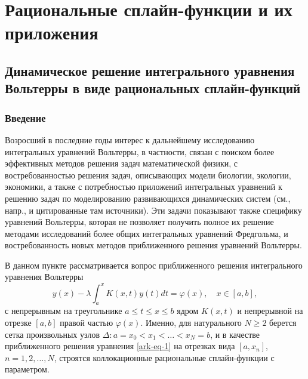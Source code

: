 \chapter{Рациональные сплайн-функции и их приложения}

\section{Динамическое решение интегрального уравнения Вольтерры в виде
рациональных сплайн-функций}
%

\subsection{Введение}

Возросший в последние годы интерес к дальнейшему исследованию интегральных уравнений
Вольтерры, в частности, связан с поиском более эффективных методов решения задач
математической физики, с востребованностью решения задач, описывающих модели
биологии, экологии, экономики, а также с потребностью приложений интегральных уравнений
к решению задач по моделированию развивающихся динамических систем (см., напр., \cite{ark-3}
и цитированные там источники). Эти задачи показывают также специфику
уравнений Вольтерры, которая не позволяет получить полное их решение методами
исследований более общих интегральных уравнений Фредгольма, и востребованность новых методов
приближенного решения уравнений Вольтерры.

В данном пункте рассматривается вопрос приближенного решения интегрального уравнения
 Вольтерры
\begin{equation}\label{ark-eq-1}
y(x)-\lambda \int_a^x K(x,t)y(t) dt=\varphi(x),\quad x\in[a,b],
\end{equation}
с непрерывным на треугольнике $a\leqslant t\leqslant x\leqslant b$ ядром $K(x,t)$
и непрерывной на отрезке $[a,b]$ правой частью $\varphi(x)$. Именно, для натурального
$N\geqslant 2$ берется сетка произвольных узлов $\Delta:a=x_0<x_1<\dots <x_N=b$,  и
в качестве приближенного решения уравнения \eqref{ark-eq-1} на отрезках вида $[a,x_n]$,
$n=1,2,\dots,N$, строятся коллокационные рациональные сплайн-функции с параметром.

